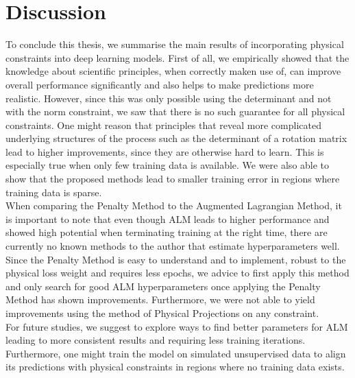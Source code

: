 \label{section:discussion}
\section{Discussion}

To conclude this thesis, we summarise the main results of incorporating physical constraints into deep learning models. First of all, we empirically showed that the knowledge about scientific principles, when correctly maken use of, can improve overall performance significantly and also helps to make predictions more realistic. However, since this was only possible using the determinant and not with the norm constraint, we saw that there is no such guarantee for all physical constraints. One might reason that principles that reveal more complicated underlying structures of the process such as the determinant of a rotation matrix lead to higher improvements, since they are otherwise hard to learn. This is especially true when only few training data is available. We were also able to show that the proposed methods lead to smaller training error in regions where training data is sparse.\\
\indent When comparing the Penalty Method to the Augmented Lagrangian Method, it is important to note that even though ALM leads to higher performance and showed high potential when terminating training at the right time, there are currently no known methods to the author that estimate hyperparameters well. Since the Penalty Method is easy to understand   and to implement, robust to the physical loss weight and requires less epochs, we advice to first apply this method and only search for good ALM hyperparameters once applying the Penalty Method has shown improvements. Furthermore, we were not able to yield improvements using the method of Physical Projections on any constraint.\\
\indent For future studies, we suggest to explore ways to find better parameters for ALM leading to more consistent results and requiring less training iterations. Furthermore, one might train the model on simulated unsupervised data to align its predictions with physical constraints in regions where no training data exists.









\clearpage

